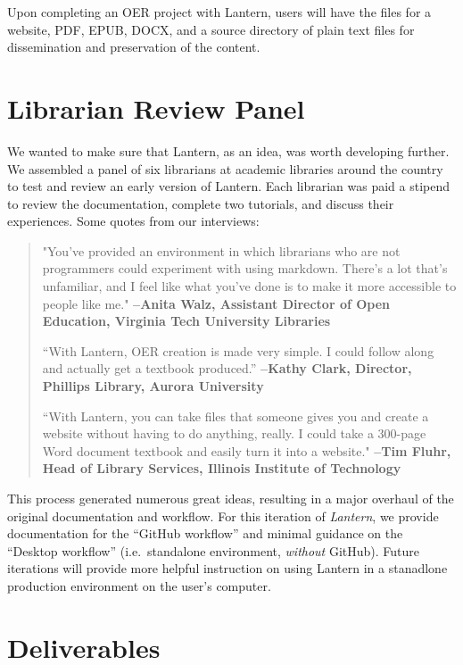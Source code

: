 \documentclass[
  11pt,
  openany]{book}
\begin{document}
Upon completing an OER project with Lantern, users will have the files for a
website, PDF, EPUB, DOCX, and a source directory of plain text files for
dissemination and preservation of the content.

\hypertarget{librarian-review-panel}{%
\section{Librarian Review Panel}\label{librarian-review-panel}}

We wanted to make sure that Lantern, as an idea, was worth developing further.
We assembled a panel of six librarians at academic libraries around the
country to test and review an early version of Lantern. Each librarian was
paid a stipend to review the documentation, complete two tutorials, and
discuss their experiences. Some quotes from our interviews:

\begin{quote}
"You've provided an environment in which librarians who are not programmers
could experiment with using markdown. There's a lot that's unfamiliar, and I
feel like what you've done is to make it more accessible to people like me."
\textbf{--Anita Walz, Assistant Director of Open Education, Virginia Tech
University Libraries}

``With Lantern, OER creation is made very simple. I could follow along and
actually get a textbook produced.'' \textbf{--Kathy Clark, Director, Phillips
Library, Aurora University}

``With Lantern, you can take files that someone gives you and create a website
without having to do anything, really. I could take a 300-page Word document
textbook and easily turn it into a website." \textbf{--Tim Fluhr, Head of
Library Services, Illinois Institute of Technology}
\end{quote}

This process generated numerous great ideas, resulting in a major overhaul of
the original documentation and workflow. For this iteration of \emph{Lantern},
we provide documentation for the ``GitHub workflow'' and minimal guidance on
the ``Desktop workflow'' (i.e.~standalone environment, \emph{without} GitHub).
Future iterations will provide more helpful instruction on using Lantern in a
stanadlone production environment on the user's computer.

\hypertarget{deliverables}{%
\section{Deliverables}\label{deliverables}}
\end{document}
